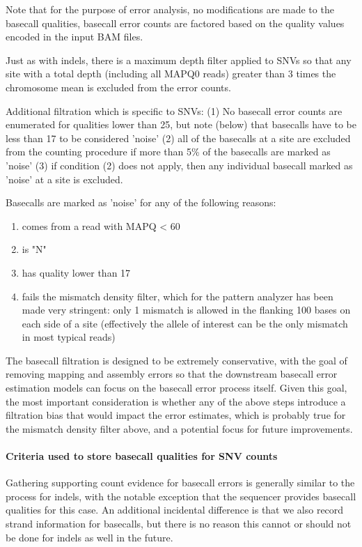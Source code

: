 \documentclass{article}
\begin{document}
Note that for the purpose of error analysis, no modifications are made to the basecall qualities, basecall error counts are factored based on the quality values encoded in the input BAM files.

Just as with indels, there is a maximum depth filter applied to SNVs so that any site with a total depth (including all MAPQ0 reads) greater than 3 times the chromosome mean is excluded from the error counts.

Additional filtration which is specific to SNVs: (1) No basecall error counts are enumerated for qualities lower than 25, but note (below) that basecalls have to be less than 17 to be considered 'noise' (2) all of the basecalls at a site are excluded from the counting procedure if more than 5\% of the basecalls are marked as 'noise' (3) if condition (2) does not apply, then any individual basecall marked as 'noise' at a site is excluded.

Basecalls are marked as 'noise' for any of the following reasons:

\begin{enumerate}
\item comes from a read with MAPQ < 60
\item is "N"
\item has quality lower than 17
\item fails the mismatch density filter, which for the pattern analyzer has been made very stringent: only 1 mismatch is allowed in the flanking 100 bases on each side of a site (effectively the allele of interest can be the only mismatch in most typical reads)
\end{enumerate}

The basecall filtration is designed to be extremely conservative, with the goal of removing mapping and assembly errors so that the downstream basecall error estimation models can focus on the basecall error process itself. Given this goal, the most important consideration is whether any of the above steps introduce a filtration bias that would impact the error estimates, which is probably true for the mismatch density filter above, and a potential focus for future improvements.


\paragraph{Criteria used to store basecall qualities for SNV counts}

Gathering supporting count evidence for basecall errors is generally similar to the process for indels, with the notable exception that the sequencer provides basecall qualities for this case. An additional incidental difference is that we also record strand information for basecalls, but there is no reason this cannot or should not be done for indels as well in the future.
\end{document}
